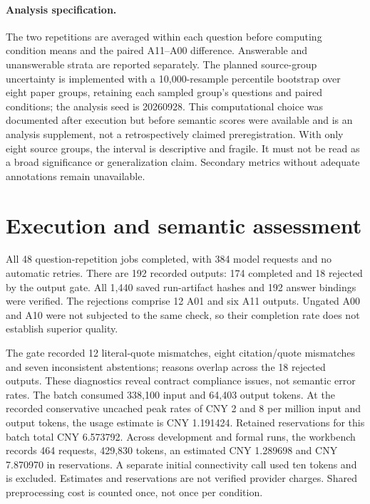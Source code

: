 \documentclass{article}
\begin{document}
\paragraph{Analysis specification.}
The two repetitions are averaged within each question before computing condition means and the paired A11--A00 difference. Answerable and unanswerable strata are reported separately. The planned source-group uncertainty is implemented with a 10,000-resample percentile bootstrap over eight paper groups, retaining each sampled group's questions and paired conditions; the analysis seed is 20260928. This computational choice was documented after execution but before semantic scores were available and is an analysis supplement, not a retrospectively claimed preregistration. With only eight source groups, the interval is descriptive and fragile. It must not be read as a broad significance or generalization claim. Secondary metrics without adequate annotations remain unavailable.

\section{Execution and semantic assessment}
All 48 question-repetition jobs completed, with 384 model requests and no automatic retries. There are 192 recorded outputs: 174 completed and 18 rejected by the output gate. All 1,440 saved run-artifact hashes and 192 answer bindings were verified. The rejections comprise 12 A01 and six A11 outputs. Ungated A00 and A10 were not subjected to the same check, so their completion rate does not establish superior quality.

\begin{table}[t]
\centering\small

\caption{Execution status only. Rejections remain in each condition's denominator. The table is generated from stored runs and contains no human quality scores.}
\end{table}

The gate recorded 12 literal-quote mismatches, eight citation/quote mismatches and seven inconsistent abstentions; reasons overlap across the 18 rejected outputs. These diagnostics reveal contract compliance issues, not semantic error rates. The batch consumed 338,100 input and 64,403 output tokens. At the recorded conservative uncached peak rates of CNY 2 and 8 per million input and output tokens, the usage estimate is CNY 1.191424. Retained reservations for this batch total CNY 6.573792. Across development and formal runs, the workbench records 464 requests, 429,830 tokens, an estimated CNY 1.289698 and CNY 7.870970 in reservations. A separate initial connectivity call used ten tokens and is excluded. Estimates and reservations are not verified provider charges. Shared preprocessing cost is counted once, not once per condition.
\end{document}
